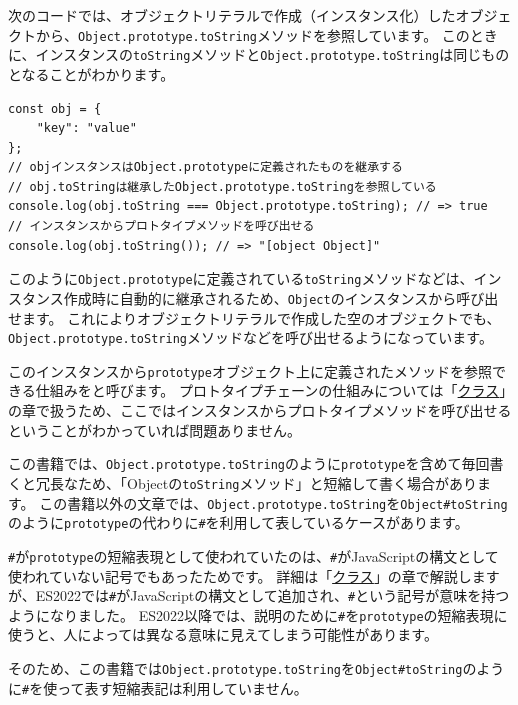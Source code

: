 次のコードでは、オブジェクトリテラルで作成（インスタンス化）したオブジェクトから、\texttt{Object.prototype.toString}メソッドを参照しています。
このときに、インスタンスの\texttt{toString}メソッドと\texttt{Object.prototype.toString}は同じものとなることがわかります。

\begin{lstlisting}
const obj = {
    "key": "value"
};
// objインスタンスはObject.prototypeに定義されたものを継承する
// obj.toStringは継承したObject.prototype.toStringを参照している
console.log(obj.toString === Object.prototype.toString); // => true
// インスタンスからプロトタイプメソッドを呼び出せる
console.log(obj.toString()); // => "[object Object]"
\end{lstlisting}

このように\texttt{Object.prototype}に定義されている\texttt{toString}メソッドなどは、インスタンス作成時に自動的に継承されるため、\texttt{Object}のインスタンスから呼び出せます。
これによりオブジェクトリテラルで作成した空のオブジェクトでも、\texttt{Object.prototype.toString}メソッドなどを呼び出せるようになっています。

このインスタンスから\texttt{prototype}オブジェクト上に定義されたメソッドを参照できる仕組みを\textbf{}と呼びます。
プロトタイプチェーンの仕組みについては「\hyperlink{class}{クラス}」の章で扱うため、ここではインスタンスからプロトタイプメソッドを呼び出せるということがわかっていれば問題ありません。

\begin{tcolorbox}[enhanced jigsaw,breakable,title=\texttt{Object\#toString}という短縮した表記について]\label{prototype-shorthand-syntax}

この書籍では、\texttt{Object.prototype.toString}のように\texttt{prototype}を含めて毎回書くと冗長なため、「Objectの\texttt{toString}メソッド」と短縮して書く場合があります。
この書籍以外の文章では、\texttt{Object.prototype.toString}を\texttt{Object\#toString}のように\texttt{prototype}の代わりに\texttt{\#}を利用して表しているケースがあります。

\texttt{\#}が\texttt{prototype}の短縮表現として使われていたのは、\texttt{\#}がJavaScriptの構文として使われていない記号でもあったためです。
詳細は「\hyperlink{class}{クラス}」の章で解説しますが、ES2022では\texttt{\#}がJavaScriptの構文として追加され、\texttt{\#}という記号が意味を持つようになりました。
ES2022以降では、説明のために\texttt{\#}を\texttt{prototype}の短縮表現に使うと、人によっては異なる意味に見えてしまう可能性があります。

そのため、この書籍では\texttt{Object.prototype.toString}を\texttt{Object\#toString}のように\texttt{\#}を使って表す短縮表記は利用していません。
\end{tcolorbox}

